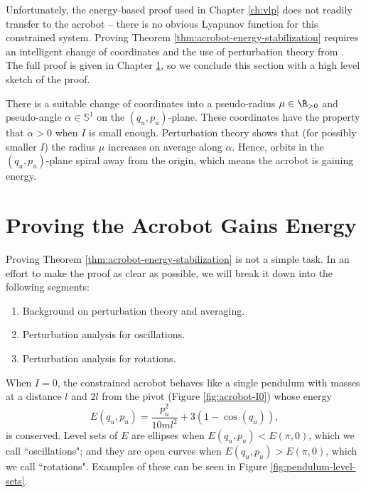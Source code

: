 Unfortunately, the energy-based proof used in Chapter \ref{ch:vlp} does not
readily transfer to the acrobot -- there is no obvious Lyapunov function for
this constrained system.
Proving Theorem \ref{thm:acrobot-energy-stabilization} requires an intelligent
change of coordinates and the use of perturbation theory from
\cite{khalil_nonlinear}.
The full proof is given in Chapter \ref{sec:acrobot-proof}, so 
we conclude this section with a high level sketch of the proof.

There is a suitable change of coordinates into a pseudo-radius 
\(\mu \in \R_{>0}\) and pseudo-angle \(\alpha \in \mathbb{S}^1\) on the
\((q_u,p_u)\)-plane.
These coordinates have the property that \(\dot{\alpha} > 0\) when
\(I\) is small enough.
Perturbation theory shows that (for possibly smaller \(I\)) the radius \(\mu\)
increases on average along \(\alpha\).
Hence, orbits in the \((q_u,p_u)\)-plane spiral away from the origin, 
which means the acrobot is gaining energy.
 
\section{Proving the Acrobot Gains Energy}\label{sec:acrobot-proof}
Proving Theorem \ref{thm:acrobot-energy-stabilization} is not a simple task.
In an effort to make the proof as clear as possible, we will break it down into
the following segments:
\begin{enumerate}
    \item Background on perturbation theory and averaging.
    \item Perturbation analysis for oscillations.
    \item Perturbation analysis for rotations.
\end{enumerate}

When \(I = 0\), the constrained acrobot behaves like a single
pendulum with masses at a distance \(l\) and \(2l\) from the pivot 
(Figure \ref{fig:acrobot-I0}) whose energy
\begin{equation}\label{eqn:acrobot-nominal-E}
    E(q_u,p_u) = \frac{p_u^2}{10ml^2} + 3(1 - \cos(q_u))
    ,
\end{equation}
is conserved.
Level sets of \(E\) are ellipses when \(E(q_u,p_u) < E(\pi,0)\), which we call
``oscillations"; and they are open curves when \(E(q_u,p_u) > E(\pi,0)\), which we call
``rotations". 
Examples of these can be seen in Figure \ref{fig:pendulum-level-sets}.

